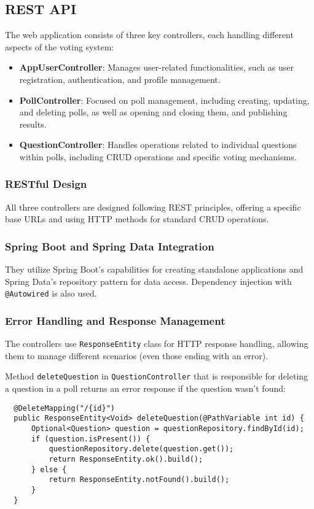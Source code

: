 \subsection{REST API}
The web application consists of three key controllers, each handling different aspects of the voting system:

\begin{itemize}
    \item \textbf{AppUserController}: Manages user-related functionalities, such as user registration, authentication, and profile management.
    \item \textbf{PollController}: Focused on poll management, including creating, updating, and deleting polls, as well as opening and closing them, and publishing results.
    \item \textbf{QuestionController}: Handles operations related to individual questions within polls, including CRUD operations and specific voting mechanisms.
\end{itemize}

\subsubsection{RESTful Design}
All three controllers are designed following REST principles, offering a specific base URLs and using HTTP methods for standard CRUD operations.

\subsubsection{Spring Boot and Spring Data Integration}
They utilize Spring Boot's capabilities for creating standalone applications and Spring Data's repository pattern for data access. Dependency injection with \texttt{@Autowired} is also used.

\subsubsection{Error Handling and Response Management}
The controllers use \texttt{ResponseEntity} class for HTTP response handling, allowing them to manage different scenarios (even those ending with an error).

Method \texttt{deleteQuestion} in \texttt{QuestionController} that is responsible for deleting a question in a poll returns an error response if the question wasn't found:
\begin{verbatim}
  @DeleteMapping("/{id}")
  public ResponseEntity<Void> deleteQuestion(@PathVariable int id) {
      Optional<Question> question = questionRepository.findById(id);
      if (question.isPresent()) {
          questionRepository.delete(question.get());
          return ResponseEntity.ok().build();
      } else {
          return ResponseEntity.notFound().build();
      }
  }
\end{verbatim}


